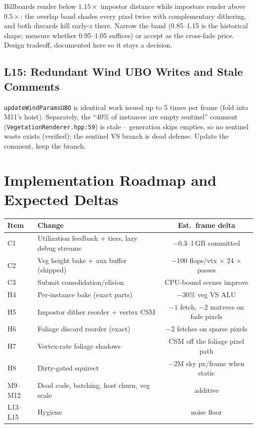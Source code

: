 \documentclass[11pt,a4paper]{article}
\begin{document}
Billboards render below $1.15\times$ impostor distance while impostors
render above $0.5\times$: the overlap band shades every pixel twice with
complementary dithering, and both discards kill early-$z$ there. Narrow the
band (0.85--1.15 is the historical shape; measure whether 0.95--1.05
suffices) or accept as the cross-fade price. Design tradeoff, documented
here so it stays a decision.

\subsection{L15: Redundant Wind UBO Writes and Stale Comments}
\label{sec:l15}

\texttt{updateWindParamsUBO} is identical work issued up to 5 times per
frame (fold into M11's hoist). Separately, the ``40\% of instances are empty
sentinel'' comment (\texttt{VegetationRenderer.hpp:59}) is stale --
generation skips empties, so no sentinel waste exists (verified); the
sentinel VS branch is dead defense. Update the comment, keep the branch.

\section{Implementation Roadmap and Expected Deltas}

\begin{table}[h]
\centering
\small
\begin{tabular}{@{}llc@{}}
\toprule
\textbf{Item} & \textbf{Change} & \textbf{Est.\ frame delta} \\
\midrule
C1 & Utilization feedback + tiers, lazy debug streams & $-0.3$--1\,GB committed \\
C2 & Veg height bake + aux buffer (shipped) & $-100$ flops/vtx $\times$ 24 $\times$ passes \\
C3 & Submit consolidation/elision & CPU-bound scenes improve \\
H4 & Per-instance bake (exact parts) & $-30$\% veg VS ALU \\
H5 & Impostor dither reorder + vertex CSM & $-1$ fetch, $-2$ matvecs on fade pixels \\
H6 & Foliage discard reorder (exact) & $-2$ fetches on sparse pixels \\
H7 & Vertex-rate foliage shadows & CSM off the foliage pixel path \\
H8 & Dirty-gated equirect & $-2$M sky px/frame when static \\
M9--M12 & Dead code, batching, host churn, veg scale & additive \\
L13--L15 & Hygiene & noise floor \\
\bottomrule
\end{tabular}
\end{table}
\end{document}
